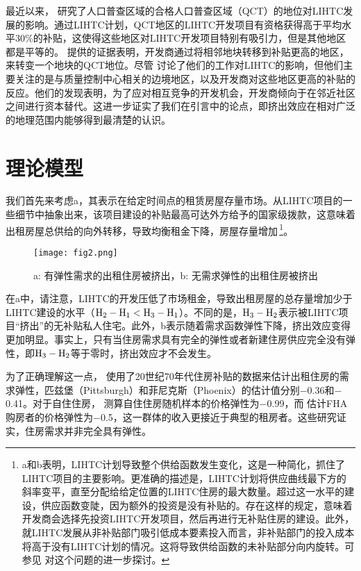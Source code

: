 \documentclass[lang=cn,11pt,a4paper]{paper}
\begin{document}
最近以来，\cite{Baum-Snow2009654} 研究了人口普查区域的合格人口普查区域（QCT）的地位对LIHTC发展的影响。通过LIHTC计划，QCT地区的LIHTC开发项目有资格获得高于平均水平30\%的补贴，这使得这些地区对LIHTC开发项目特别有吸引力，但是其他地区都是平等的。\cite{Baum-Snow2009654} 提供的证据表明，开发商通过将相邻地块转移到补贴更高的地区，来转变一个地块的QCT地位。尽管 \cite{Baum-Snow2009654} 讨论了他们的工作对LIHTC的影响，但他们主要关注的是与质量控制中心相关的边境地区，以及开发商对这些地区更高的补贴的反应。他们的发现表明，为了应对相互竞争的开发机会，开发商倾向于在邻近社区之间进行资本替代。这进一步证实了我们在引言中的论点，即挤出效应在相对广泛的地理范围内能够得到最清楚的认识。

\section{理论模型}\label{sec3}

我们首先来考虑a，其表示在给定时间点的租赁房屋存量市场。从LIHTC项目的一些细节中抽象出来，该项目建设的补贴最高可达外方给予的国家级拨款，这意味着出租房屋总供给的向外转移，导致均衡租金下降，房屋存量增加\,\footnote{a和b表明，LIHTC计划导致整个供给函数发生变化，这是一种简化，抓住了LIHTC项目的主要影响。更准确的描述是，LIHTC计划将供应曲线最下方的斜率变平，直至分配给给定位置的LIHTC住房的最大数量。超过这一水平的建设，供应函数变陡，因为额外的投资是没有补贴的。存在这样的规定，意味着开发商会选择先投资LIHTC开发项目，然后再进行无补贴住房的建设。此外，就LIHTC发展从非补贴部门吸引低成本要素投入而言，非补贴部门的投入成本将高于没有LIHTC计划的情况。这将导致供给函数的未补贴部分向内旋转。可参见 \cite{Olsen2007618} 对这个问题的进一步探讨。}。

\begin{figure}[h]
	\centering
	\texttt{[image: fig2.png]}
	\caption{a: 有弹性需求的出租住房被挤出，b: 无需求弹性的出租住房被挤出}\label{fig2}
\end{figure}

在a中，请注意，LIHTC的开发压低了市场租金，导致出租房屋的总存量增加少于LIHTC建设的水平（$\rm{H}_2-\rm{H}_1 < \rm{H}_3-\rm{H}_1$）。不同的是，$\rm{H}_3-\rm{H}_2$表示被LIHTC项目“挤出”的无补贴私人住宅。此外，b表示随着需求函数弹性下降，挤出效应变得更加明显。事实上，只有当住房需求具有完全的弹性或者新建住房供应完全没有弹性，即$\rm{H}_3-\rm{H}_2$等于零时，挤出效应才不会发生。

为了正确理解这一点，\cite{Hanushek1980449} 使用了20世纪70年代住房补贴的数据来估计出租住房的需求弹性，匹兹堡（Pittsburgh）和菲尼克斯（Phoenix）的估计值分别$-$0.36和$-$0.41。对于自住住房，\cite{Rosen19791} 测算自住住房随机样本的价格弹性为$-$0.99，而 \cite{Rosen19791} 估计FHA购房者的价格弹性为$-$0.5，这一群体的收入更接近于典型的租房者。这些研究证实，住房需求并非完全具有弹性。
\end{document}
